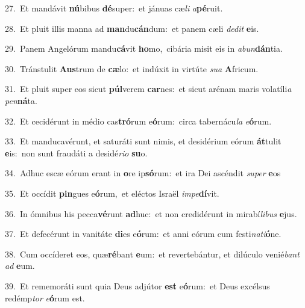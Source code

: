 {\numbfont\textcolor{\numbcolor}{27.}}~Et mandávit \textbf{nú}\-bibus \textbf{dé}\-super:~\star et jánuas cæ\textit{li} \textit{a}\-\textbf{pé}ruit.\par
{\numbfont\textcolor{\numbcolor}{28.}}~Et pluit illis manna ad \textbf{man}\-du\-\textbf{cán}\-dum:~\star et panem cæli \textit{de}\-\textit{dit} \textbf{e}\-is.\par
{\numbfont\textcolor{\numbcolor}{29.}}~Panem Angelórum mandu\-\textbf{cá}\-vit \textbf{ho}\-mo,~\star cibária misit eis in \textit{ab}\-\textit{un}\textbf{dán}tia.\par
{\numbfont\textcolor{\numbcolor}{30.}}~Tránstulit \textbf{Aus}\-trum de \textbf{cæ}\-lo:~\star et indúxit in virtúte \textit{su}\-\textit{a} \textbf{A}\-fricum.\par
{\numbfont\textcolor{\numbcolor}{31.}}~Et pluit super eos sicut \textbf{púl}\-verem \textbf{car}\-nes:~\star et sicut arénam maris volatíli\textit{a} \textit{pen}\-\textbf{ná}ta.\par
{\numbfont\textcolor{\numbcolor}{32.}}~Et cecidérunt in médio cas\-\textbf{tró}\-rum e\-\textbf{ó}\-rum:~\star circa tabernácu\textit{la} \textit{e}\-\textbf{ó}rum.\par
{\numbfont\textcolor{\numbcolor}{33.}}~Et manducavérunt, et saturáti sunt nimis, et desidérium eórum \textbf{át}\-tulit \textbf{e}\-is:~\star non sunt fraudáti a desidé\-\textit{ri}\-\textit{o} \textbf{su}\-o.\par
{\numbfont\textcolor{\numbcolor}{34.}}~Adhuc escæ eórum erant in \textbf{o}\-re ip\-\textbf{só}\-rum:~\star et ira Dei ascéndit \textit{su}\-\textit{per} \textbf{e}\-os\par
{\numbfont\textcolor{\numbcolor}{35.}}~Et occídit \textbf{pin}\-gues e\-\textbf{ó}\-rum,~\star et eléctos Israël \textit{im}\-\textit{pe}\textbf{dí}vit.\par
{\numbfont\textcolor{\numbcolor}{36.}}~In ómnibus his pecca\-\textbf{vé}\-runt \textbf{ad}\-huc:~\star et non credidérunt in mirabí\-\textit{li}\-\textit{bus} \textbf{e}\-jus.\par
{\numbfont\textcolor{\numbcolor}{37.}}~Et defecérunt in vanitáte \textbf{di}\-es e\-\textbf{ó}\-rum:~\star et anni eórum cum festi\-\textit{na}\-\textit{ti}\textbf{ó}ne.\par
{\numbfont\textcolor{\numbcolor}{38.}}~Cum occíderet eos, quæ\-\textbf{ré}\-bant \textbf{e}\-um:~\star et revertebántur, et dilúculo venié\textit{bant} \textit{ad} \textbf{e}\-um.\par
{\numbfont\textcolor{\numbcolor}{39.}}~Et rememoráti sunt quia Deus adjútor \textbf{est} e\-\textbf{ó}\-rum:~\star et Deus excélsus redémp\textit{tor} \textit{e}\-\textbf{ó}rum est.\par
